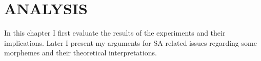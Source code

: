 \chapter{\MakeUppercase{Analysis}}
\setcounter{exx}{0}

In this chapter I first evaluate the results of the experiments and their implications. Later I present my arguments for SA related issues regarding some morphemes and their theoretical interpretations. 








